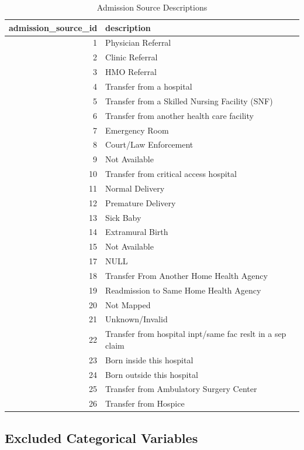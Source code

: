 \begin{table}[H]
    \centering
    \caption{Admission Source Descriptions}
    \renewcommand{\arraystretch}{1.2}
    \begin{tabularx}{\textwidth}{rX}
    \toprule
    \textbf{admission\_source\_id} & \textbf{description} \\
    \midrule
    1 & Physician Referral \\
    2 & Clinic Referral \\
    3 & HMO Referral \\
    4 & Transfer from a hospital \\
    5 & Transfer from a Skilled Nursing Facility (SNF) \\
    6 & Transfer from another health care facility \\
    7 & Emergency Room \\
    8 & Court/Law Enforcement \\
    9 & Not Available \\
    10 & Transfer from critical access hospital \\
    11 & Normal Delivery \\
    12 & Premature Delivery \\
    13 & Sick Baby \\
    14 & Extramural Birth \\
    15 & Not Available \\
    17 & NULL \\
    18 & Transfer From Another Home Health Agency \\
    19 & Readmission to Same Home Health Agency \\
    20 & Not Mapped \\
    21 & Unknown/Invalid \\
    22 & Transfer from hospital inpt/same fac reslt in a sep claim \\
    23 & Born inside this hospital \\
    24 & Born outside this hospital \\
    25 & Transfer from Ambulatory Surgery Center \\
    26 & Transfer from Hospice \\
    \bottomrule
    \end{tabularx}
    \label{tab:admission-source}
\end{table}

\subsection{Excluded Categorical Variables}

